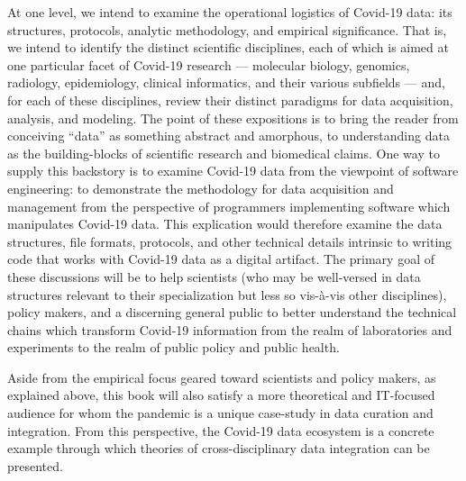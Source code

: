 \documentclass{statsoc}
\newcommand{\p}[1]{

\vspace{.75em}#1}
\newcommand{\textscc}[1]{{\color{orr!35!black}{{%
						\fontfamily{Cabin-TLF}\fontseries{b}\selectfont{\textsc{\scriptsize{#1}}}}}}}
\newcommand{\AcronymText}[1]{{\textscc{#1}}}
\newcommand{\q}[1]{{\fontfamily{qcr}\selectfont ``}#1{\fontfamily{qcr}\selectfont ''}}
\newcommand{\API}{\resizebox{!}{7pt}{\AcronymText{API}}}
\newcommand{\visavis}{vis-\`a-vis}
\begin{document}
{%
\p{At one level, we intend to examine the 
operational logistics of Covid-19 data: its 
structures, protocols, analytic methodology, 
and empirical significance.  That is, we 
intend to identify the distinct scientific 
disciplines, each of which is aimed at one 
particular facet of Covid-19 research --- molecular 
biology, genomics, radiology, epidemiology, clinical 
informatics, and their various subfields 
--- and, for each of these disciplines, 
review their distinct paradigms for 
data acquisition, analysis, and modeling.  
The point of these expositions is to bring 
the reader from conceiving \q{data} as something 
abstract and amorphous, to understanding 
data as the building-blocks of scientific 
research and biomedical claims.  One way to supply this backstory 
is to examine Covid-19 data from the viewpoint 
of software engineering: to demonstrate 
the methodology for data acquisition and 
management from the perspective of programmers 
implementing software which manipulates Covid-19 data.  
This explication would therefore examine the 
data structures, file formats, \API{} protocols, 
and other technical details intrinsic to writing 
code that works with Covid-19 data as a 
digital artifact.  The primary 
goal of these discussions will be to help 
scientists (who may be well-versed in data 
structures relevant to their specialization 
but less so \visavis{} other disciplines), 
policy makers, and a discerning general public 
to better understand the technical chains which transform 
Covid-19 information from the realm of 
laboratories and experiments to the realm of 
public policy and public health.}


\p{Aside from the empirical focus geared toward scientists and 
policy makers, as explained above, this book will also satisfy a 
more theoretical and IT-focused audience for whom the 
pandemic is a unique case-study in data 
curation and integration.  From this perspective, 
the Covid-19 data ecosystem is a concrete example 
through which theories of cross-disciplinary data integration 
can be presented.}


}
\end{document}
